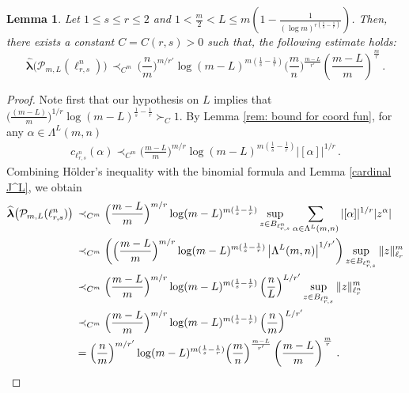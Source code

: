 \documentclass[12pt]{amsart}
\numberwithin{subsection}{section}
\newtheorem{lemma}[theorem]{Lemma}
\theoremstyle{definition}
\theoremstyle{remark}
\begin{document}
\begin{lemma}\label{lem: first bound for middle L }
Let $1 \leq s \leq r \leq 2$ and $1<\frac{m}{2}<L\le m\left(1-\frac{1}{(\log m)^{r(\frac1{s}-\frac1{r})}}\right)$. Then, there exists
a constant $C=C(r,s)>0$ such that, the following estimate holds{\rm:}
\begin{equation*}
\widehat{\boldsymbol{\lambda}}\big(\mathcal P_{m,L}(\ell_{r,s}^n)\big)
\,\prec_{C^m}
\, \Big(\frac{n}{m}\Big)^{m/r'} \log(m-L)^{m(\frac1{s}-\frac1{r})}
\Big(\frac{m}{n}\Big)^{\frac{m-L}{r'}}\left(\frac{m-L}{m}\right)^{\frac{m}{r}}\,.
\end{equation*}
\end{lemma}
\begin{proof}

Note first that our hypothesis on $L$ implies that $\Big(\frac{(m-L)}{m}\Big)^{1/r}\log(m-L)^{\frac1{s}-\frac1{r}}\succ_C 1.$
By Lemma \ref{rem: bound for coord fun}, for any $\alpha\in\Lambda^L(m,n)$
\begin{align*}\label{bound norm in l_rs few variables}
c_{\ell_{r,s}^n}(\alpha)
\prec_{C^m}
\Big(\frac{m-L}{m}\Big)^{m/r}\log(m-L)^{m(\frac1{s}-\frac1{r})}|[\alpha]|^{1/r}\,.
\end{align*}
Combining  H\"older's inequality with the binomial formula  and Lemma \ref{cardinal J^L}, we obtain
\begin{align*}
\widehat{\boldsymbol{\lambda}}\big(\mathcal P_{m,L}(\ell_{r,s}^n)\big) \, & \prec_{C^m} \Big(\frac{m-L}{m}\Big)^{m/r}\log(m-L)^{m(\frac1{s}-\frac1{r})} \sup_{z \in B_{\ell_{r,s}^n}}\sum_{\alpha \in \Lambda^{L}(m,n)} |[\alpha]|^{1/r}|z^\alpha|
\nonumber\\
& \prec_{C^m}
\left(\Big(\frac{m-L}{m}\Big)^{m/r}\log(m-L)^{m(\frac1{s}-\frac1{r})} \left| \Lambda^{L}(m,n) \right|^{1/r'} \right) \sup_{z \in B_{\ell_{r,s}^n}}\|z\|_{\ell_r}^{m}\nonumber\\
& \prec_{C^m}  \Big(\frac{m-L}{m}\Big)^{m/r}\log(m-L)^{m(\frac1{s}-\frac1{r})}  \left( \frac{n}{L} \right)^{L/r'}
 \sup_{z \in B_{\ell_{r,s}^n}} \|z\|^m_{\ell_{r}^n}
 \nonumber\\
& \prec_{C^m}  \Big(\frac{m-L}{m}\Big)^{m/r}\log(m-L)^{m(\frac1{s}-\frac1{r})}  \left( \frac{n}{m} \right)^{L/r'}  \nonumber\\
& =  \Big(\frac{n}{m}\Big)^{m/r'}
\log(m-L)^{m(\frac1{s}-\frac1{r})}
\Big(\frac{m}{n}\Big)^{\frac{m-L}{r'}}\left(\frac{m-L}{m}\right)^{\frac{m}{r}}\,. \qedhere
\end{align*}
\end{proof}
\end{document}

